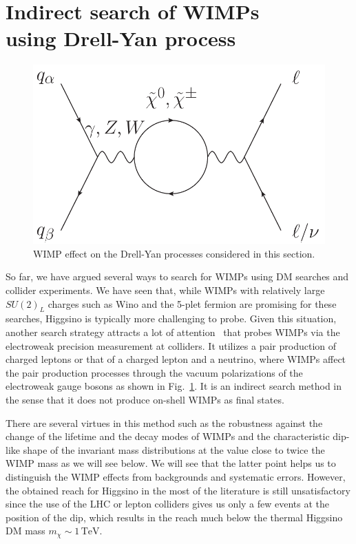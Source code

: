 \documentclass[12pt,twoside,book]{article}
\begin{document}
\section[Indirect search of WIMPs using Drell-Yan process]{
  Indirect search of WIMPs\\
  using Drell-Yan process
}
\label{sec:dy}
\setcounter{equation}{0}

\vskip 0.1in

\begin{figure}[b]
  \centering
  \includegraphics[width=0.5\hsize]{NC_CC_WIMP.pdf}
  \caption{WIMP effect on the Drell-Yan processes considered in this section.}
  \label{fig:NC_CC_WIMP}
\end{figure}

So far, we have argued several ways to search for WIMPs using DM searches and collider experiments.
We have seen that, while WIMPs with relatively large $SU(2)_L$ charges such as Wino and the 5-plet fermion are promising for these searches, Higgsino is typically more challenging to probe.
Given this situation, another search strategy attracts a lot of attention~\cite{Chigusa:2018vxz, Abe:2019egv, Alves:2014cda, Harigaya:2015yaa, Gross:2016ioi, Farina:2016rws, Matsumoto:2017vfu, DiLuzio:2018jwd, Matsumoto:2018ioi} that probes WIMPs via the electroweak precision measurement at colliders.
It utilizes a pair production of charged leptons or that of a charged lepton and a neutrino, where WIMPs affect the pair production processes through the vacuum polarizations of the electroweak gauge bosons as shown in Fig.~\ref{fig:NC_CC_WIMP}.
It is an indirect search method in the sense that it does not produce on-shell WIMPs as final states.

There are several virtues in this method such as the robustness against the change of the lifetime and the decay modes of WIMPs and the characteristic dip-like shape of the invariant mass distributions at the value close to twice the WIMP mass as we will see below.
We will see that the latter point helps us to distinguish the WIMP effects from backgrounds and systematic errors.
However, the obtained reach for Higgsino in the most of the literature is still unsatisfactory since the use of the LHC or lepton colliders gives us only a few events at the position of the dip, which results in the reach much below the thermal Higgsino DM mass $m_\chi \sim 1\,\mathrm{TeV}$.
\end{document}
